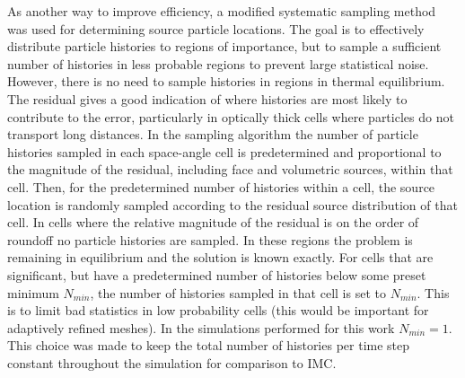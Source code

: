 As another way to improve efficiency, a modified systematic sampling
method~\cite{shultis_mc} was used for determining source particle locations.  The goal is
to effectively distribute particle histories to regions of importance, but to sample a
sufficient number of histories in less probable regions to prevent large statistical
noise.  However, there is no need to sample histories in regions in thermal equilibrium.
The residual gives a good indication of where histories are most likely to contribute to
the error, particularly in optically thick cells where particles do not transport long
distances.   In
the sampling algorithm the number of particle histories sampled in each space-angle cell
is predetermined and proportional to the magnitude of the residual, including face and
volumetric sources, within that cell.  Then, for the predetermined number of histories
within a cell, the source location is randomly sampled according to the residual source
distribution of that cell.  In cells where the relative magnitude of the residual is on the order of roundoff no particle histories are sampled. In these 
regions the problem is remaining in equilibrium and the solution is known exactly.  For
cells that are significant, but have a predetermined number of histories below some preset
minimum $N_{min}$, the number of histories sampled in that cell is set to $N_{min}$. This
is to limit bad statistics in low probability cells (this would be important for
adaptively refined meshes).  In the simulations performed for this work $N_{min}=1$.  This
choice was made to keep the total number of histories per time step constant throughout
the simulation for comparison to IMC. 

